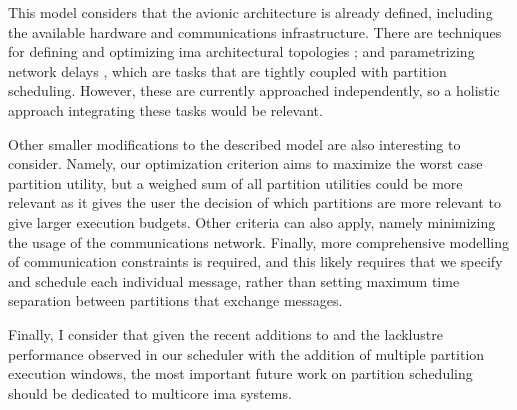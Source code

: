 \documentclass[main.tex]{subfiles}
\begin{document}
This model considers that the avionic architecture is already defined, including the available hardware and communications infrastructure.
There are techniques for defining and optimizing \gls{ima} architectural topologies \cite{annighofer2013supporting}; and parametrizing network delays \cite{benammar2017forward}, which are tasks that are tightly coupled with partition scheduling.
However, these are currently approached independently, so a holistic approach integrating these tasks would be relevant.

Other smaller modifications to the described model are also interesting to consider.
Namely, our optimization criterion aims to maximize the worst case partition utility, but a weighed sum of all partition utilities could be more relevant as it gives the user the decision of which partitions are more relevant to give larger execution budgets.
Other criteria can also apply, namely minimizing the usage of the communications network.
Finally, more comprehensive modelling of communication constraints is required, and this likely requires that we specify and schedule each individual message, rather than setting maximum time separation between partitions that exchange messages.

Finally, I consider that given the recent additions to  and the lacklustre performance observed in our scheduler with the addition of multiple partition execution windows, the most important future work on partition scheduling should be dedicated to multicore \gls{ima} systems.

\end{document}
